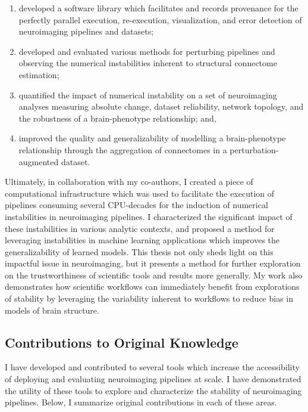 \begin{enumerate}[label=(\roman*)]
\item developed a software library which facilitates and records provenance for the perfectly parallel execution,
re-execution, visualization, and error detection of neuroimaging pipelines and datasets;
\item developed and evaluated various methods for perturbing pipelines and observing the numerical instabilities
inherent to structural connectome estimation;
\item quantified the impact of numerical instability on a set of neuroimaging analyses measuring absolute change,
dataset reliability, network topology, and the robustness of a brain-phenotype relationship; and,
\item improved the quality and generalizability of modelling a brain-phenotype relationship through the aggregation of
connectomes in a perturbation-augmented dataset.
\end{enumerate}

Ultimately, in collaboration with my co-authors, I created a piece of computational infrastructure which was used to
facilitate the execution of pipelines consuming several CPU-decades for the induction of numerical instabilities in
neuroimaging pipelines. I characterized the significant impact of these instabilities in various analytic contexts, and
proposed a method for leveraging instabilities in machine learning applications which improves the generalizability of
learned models. This thesis not only sheds light on this impactful issue in neuroimaging, but it presents a method for
further exploration on the trustworthiness of scientific tools and results more generally. My work also demonstrates
how scientific workflows can immediately benefit from explorations of stability by leveraging the variability inherent
to workflows to reduce bias in models of brain structure.

\subsection{Contributions to Original Knowledge}
I have developed and contributed to several tools which increase the accessibility of deploying and evaluating
neuroimaging pipelines at scale. I have demonstrated the utility of these tools to explore and characterize the
stability of neuroimaging pipelines. Below, I summarize original contributions in each of these areas.

